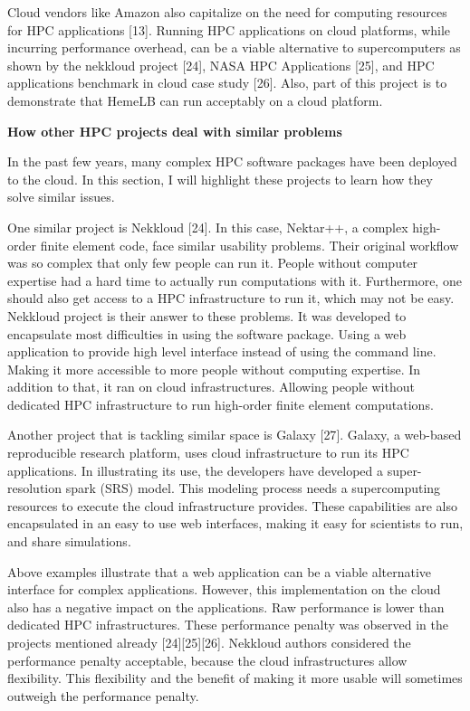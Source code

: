 \documentclass[]{article}
\begin{document}
Cloud vendors like Amazon also capitalize on the need for computing
resources for HPC applications {[}13{]}. Running HPC applications on
cloud platforms, while incurring performance overhead, can be a viable
alternative to supercomputers as shown by the nekkloud project {[}24{]},
NASA HPC Applications {[}25{]}, and HPC applications benchmark in cloud
case study {[}26{]}. Also, part of this project is to demonstrate that
HemeLB can run acceptably on a cloud platform.

\textbf{How other HPC projects deal with similar problems}

In the past few years, many complex HPC software packages have been
deployed to the cloud. In this section, I will highlight these projects
to learn how they solve similar issues.

One similar project is Nekkloud {[}24{]}. In this case, Nektar++, a
complex high-order finite element code, face similar usability problems.
Their original workflow was so complex that only few people can run it.
People without computer expertise had a hard time to actually run
computations with it. Furthermore, one should also get access to a HPC
infrastructure to run it, which may not be easy. Nekkloud project is
their answer to these problems. It was developed to encapsulate most
difficulties in using the software package. Using a web application to
provide high level interface instead of using the command line. Making
it more accessible to more people without computing expertise. In
addition to that, it ran on cloud infrastructures. Allowing people
without dedicated HPC infrastructure to run high-order finite element
computations.

Another project that is tackling similar space is Galaxy {[}27{]}.
Galaxy, a web-based reproducible research platform, uses cloud
infrastructure to run its HPC applications. In illustrating its use, the
developers have developed a super-resolution spark (SRS) model. This
modeling process needs a supercomputing resources to execute the cloud
infrastructure provides. These capabilities are also encapsulated in an
easy to use web interfaces, making it easy for scientists to run, and
share simulations.

Above examples illustrate that a web application can be a viable
alternative interface for complex applications. However, this
implementation on the cloud also has a negative impact on the
applications. Raw performance is lower than dedicated HPC
infrastructures. These performance penalty was observed in the projects
mentioned already {[}24{]}{[}25{]}{[}26{]}. Nekkloud authors considered
the performance penalty acceptable, because the cloud infrastructures
allow flexibility. This flexibility and the benefit of making it more
usable will sometimes outweigh the performance penalty.
\end{document}
